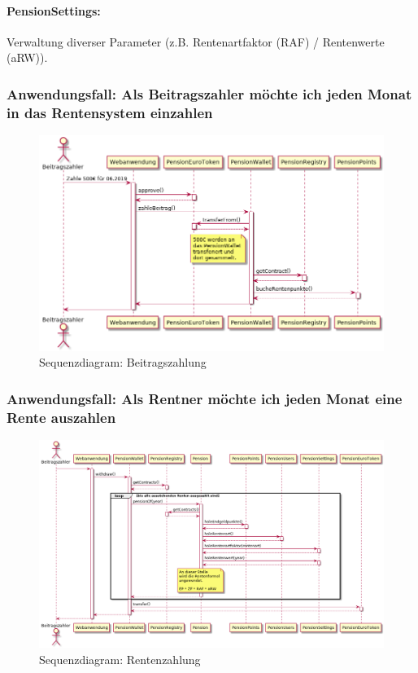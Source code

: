 \paragraph*{PensionSettings:} Verwaltung diverser Parameter (z.B. Rentenartfaktor (RAF) / Rentenwerte (aRW)).

\subsubsection{Anwendungsfall: Als Beitragszahler möchte ich jeden Monat in das Rentensystem einzahlen}

\begin{figure}[H]
    \centering
    \includegraphics[width=6.0in]{images/usecase-pay.png}
    \caption{Sequenzdiagram: Beitragszahlung}
    \label{fig:asure_architecture}
\end{figure}

\subsubsection{Anwendungsfall: Als Rentner möchte ich jeden Monat eine Rente auszahlen}

\begin{figure}[H]
    \centering
    \includegraphics[width=6.0in]{images/usecase-payout.png}
    \caption{Sequenzdiagram: Rentenzahlung}
    \label{fig:asure_architecture}
\end{figure}